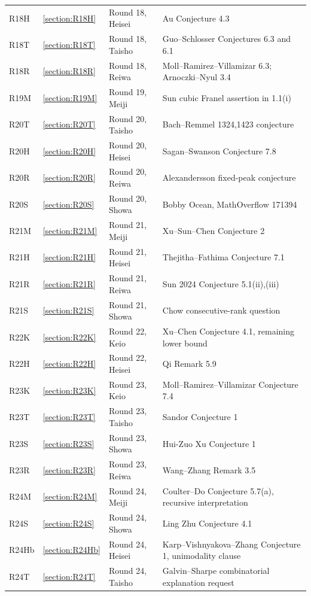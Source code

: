 \documentclass[11pt,a4paper]{article}
\begin{document}
\begin{longtable}{@{}L{.12\textwidth}L{.08\textwidth}L{.19\textwidth}L{.53\textwidth}@{}}
R18H & \ref{section:R18H} & Round 18, Heisei & Au Conjecture 4.3\\
R18T & \ref{section:R18T} & Round 18, Taisho & Guo--Schlosser Conjectures 6.3 and 6.1\\
R18R & \ref{section:R18R} & Round 18, Reiwa & Moll--Ramirez--Villamizar 6.3; Arnoczki--Nyul 3.4\\
R19M & \ref{section:R19M} & Round 19, Meiji & Sun cubic Franel assertion in 1.1(i)\\
R20T & \ref{section:R20T} & Round 20, Taisho & Bach--Remmel {1324,1423} conjecture\\
R20H & \ref{section:R20H} & Round 20, Heisei & Sagan--Swanson Conjecture 7.8\\
R20R & \ref{section:R20R} & Round 20, Reiwa & Alexandersson fixed-peak conjecture\\
R20S & \ref{section:R20S} & Round 20, Showa & Bobby Ocean, MathOverflow 171394\\
R21M & \ref{section:R21M} & Round 21, Meiji & Xu--Sun--Chen Conjecture 2\\
R21H & \ref{section:R21H} & Round 21, Heisei & Thejitha--Fathima Conjecture 7.1\\
R21R & \ref{section:R21R} & Round 21, Reiwa & Sun 2024 Conjecture 5.1(ii),(iii)\\
R21S & \ref{section:R21S} & Round 21, Showa & Chow consecutive-rank question\\
R22K & \ref{section:R22K} & Round 22, Keio & Xu--Chen Conjecture 4.1, remaining lower bound\\
R22H & \ref{section:R22H} & Round 22, Heisei & Qi Remark 5.9\\
R23K & \ref{section:R23K} & Round 23, Keio & Moll--Ramirez--Villamizar Conjecture 7.4\\
R23T & \ref{section:R23T} & Round 23, Taisho & Sandor Conjecture 1\\
R23S & \ref{section:R23S} & Round 23, Showa & Hui-Zuo Xu Conjecture 1\\
R23R & \ref{section:R23R} & Round 23, Reiwa & Wang--Zhang Remark 3.5\\
R24M & \ref{section:R24M} & Round 24, Meiji & Coulter--Do Conjecture 5.7(a), recursive interpretation\\
R24S & \ref{section:R24S} & Round 24, Showa & Ling Zhu Conjecture 4.1\\
R24Hb & \ref{section:R24Hb} & Round 24, Heisei & Karp--Vishnyakova--Zhang Conjecture 1, unimodality clause\\
R24T & \ref{section:R24T} & Round 24, Taisho & Galvin--Sharpe combinatorial explanation request\\

\end{longtable}
\end{document}
